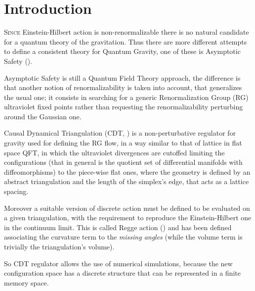 
\cleardoublepage
{}

\chapter*{Introduction}
%
	{}


\lettrine[lines=3]{\color{BrickRed}S}{ince} Einstein-Hilbert action is
non-renormalizable there is no natural candidate for a quantum theory of the
gravitation. Thus there are more different attempts to define a consistent
theory for Quantum Gravity, one of these is Asymptotic Safety
(\cite{Weinberg1979}).
\newline

Asymptotic Safety is still a Quantum Field Theory approach, the difference  is
that another notion of renormalizability is taken into account, that
generalizes the usual one; it consists in searching for a generic
Renormalization Group (RG) ultraviolet fixed points rather than requesting the
renormalizability perturbing around the Gaussian one.

Causal Dynamical Triangulation (CDT, \cite{Ambjorn2012}) is a non-perturbative
regulator for gravity used for defining the RG flow, in a way similar to that
of lattice in flat space QFT, in which the ultraviolet divergences are cutoffed
limiting the configurations (that in general is the quotient set of
differential manifolds with diffeomorphisms) to the piece-wise flat ones, where
the geometry is defined by an abstract triangulation and the length of the
simplex's edge, that acts as a lattice spacing.

Moreover a suitable version of discrete action must be defined to be evaluated
on a given triangulation, with the requirement to reproduce the
Einstein-Hilbert one in the continuum limit. This is called Regge action
(\cite{Regge1961}) and has been defined associating the curvature term to the
\textit{missing angles} (while the volume term is trivially the triangulation's
volume).
\newline

So CDT regulator allows the use of numerical simulations, because the new
configuration space has a discrete structure that can be represented in a
finite memory space.

